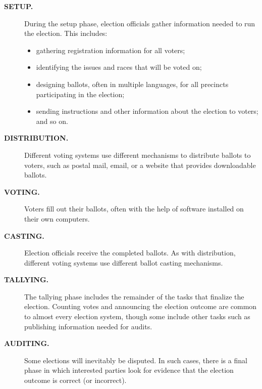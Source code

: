 \begin{description}
  \item[\textbf{SETUP.}] During the setup phase, election officials gather 
    information needed to run the election. This includes:
    \begin{itemize}
     \item gathering registration information for all voters;
     \item identifying the issues and races that will be voted on;
     \item designing ballots, often in multiple languages, for all
       precincts participating in the election;
     \item sending instructions and other information about the
       election to voters; and so on.
    \end{itemize}
  \item[\textbf{DISTRIBUTION.}] Different voting systems use different
    mechanisms to distribute ballots to voters, such as postal mail,
    email, or a website that provides downloadable ballots.
  \item[\textbf{VOTING.}] Voters fill out their ballots, often with the help of
    software installed on their own computers.
  \item[\textbf{CASTING.}] Election officials receive the completed ballots. As
    with distribution, different voting systems use different ballot
    casting mechanisms.
  \item[\textbf{TALLYING.}] The tallying phase includes the remainder of the
    tasks that finalize the election. Counting votes and announcing
    the election outcome are common to almost every election system,
    though some include other tasks such as publishing information
    needed for audits.
  \item[\textbf{AUDITING.}] Some elections will inevitably be disputed. In such
    cases, there is a final phase in which interested parties look for
    evidence that the election outcome is correct (or incorrect).
\end{description}

\clearpage\break


